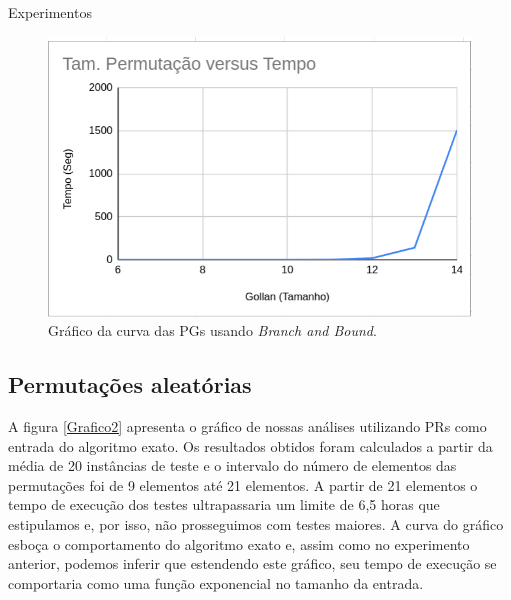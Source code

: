 \begin{chapter}{Experimentos}
\begin{figure}[H]
\centering
  \begin{minipage}[b]{0.5\textwidth}
    \includegraphics[width=\textwidth]{Imagens/Analises/B_PG2.png}
    \caption{\label{Grafico1}Gráfico da curva das PGs usando \textit{Branch and Bound}.}
  \end{minipage}
\end{figure}
    
\subsection{Permutações aleatórias}

A figura \ref{Grafico2} apresenta o gráfico de nossas análises utilizando PRs como entrada do algoritmo exato. Os resultados obtidos foram calculados a partir da média de 20 instâncias de teste e o intervalo do número de elementos das permutações foi de 9 elementos até 21 elementos. A partir de 21 elementos o tempo de execução dos testes ultrapassaria um limite de 6,5 horas que estipulamos e, por isso, não prosseguimos com testes maiores. A curva do gráfico esboça o comportamento do algoritmo exato e, assim como no experimento anterior, podemos inferir que estendendo este gráfico, seu tempo de execução se comportaria como uma função exponencial no tamanho da entrada.


\end{chapter}
